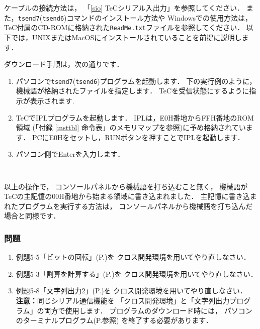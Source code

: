 ケーブルの接続方法は，
「\ref{sio} TeCシリアル入出力」を参照してください．
また，{\tt tsend7}({\tt tsend6})コマンドのインストール方法や
Windowsでの使用方法は，
TeC付属のCD-ROMに格納された{\tt ReadMe.txt}ファイルを参照してください．
以下では，UNIXまたはMacOSにインストールされていることを前提に説明します．

ダウンロード手順は，次の通りです．
\begin{enumerate}
\item パソコンで{\tt tsend7}({\tt tsend6})プログラムを起動します．
下の実行例のように，
機械語が格納されたファイルを指定します．
TeCを受信状態にするように指示が表示されます.

\item TeCでIPLプログラムを起動します．
IPLは，E0H番地からFFH番地のROM領域
(「付録 \ref{insttbl} 命令表」のメモリマップを参照)に予め格納されています．
PCにE0Hをセットし，RUNボタンを押すことでIPLを起動します．

\item パソコン側でEnterを入力します．

\begin{center}
{\footnotesize\tt
{}
}
\end{center}
\end{enumerate}

以上の操作で，
コンソールパネルから機械語を打ち込むこと無く，
機械語がTeCの主記憶の00H番地から始まる領域に書き込まれました．
主記憶に書き込まれたプログラムを実行する方法は，
コンソールパネルから機械語を打ち込んだ場合と同様です．

\subsubsection{問題}
\begin{enumerate}
\item 例題5-5「ビットの回転」(P.\pageref{rei:5_5})を
クロス開発環境を用いてやり直しなさい．
\item 例題5-3「割算を計算する」(P.\pageref{rei:5_3})を
クロス開発環境を用いてやり直しなさい．
\item 例題5-8「文字列出力2」(P.\pageref{rei:5_8})を
クロス開発環境を用いてやり直しなさい．\\
{\bf 注意：}同じシリアル通信機能を
「クロス開発環境」と「文字列出力プログラム」の両方で使用します．
プログラムのダウンロード時には，
パソコンのターミナルプログラム(P.\pageref{terminal}参照)
を終了する必要があります．
\end{enumerate}

